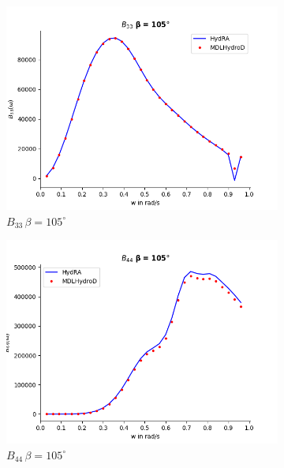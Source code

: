 \begin{figure}[H]
\begin{subfigure}[b]{0.45\textwidth}
    \end{subfigure}
    \vspace{5pt}%
    \begin{subfigure}[b]{0.45\textwidth}
        \includegraphics[width=\textwidth]{plots/kcs/rad_damp_deg_120/b33.png}
        \caption{$B_{33}\, \beta = 105^{\circ}$}
    \end{subfigure}
    \begin{subfigure}[b]{0.45\textwidth}
        \includegraphics[width=\textwidth]{plots/kcs/rad_damp_deg_120/b44.png}
        \caption{$B_{44} \, \beta = 105^{\circ}$}
    \end{subfigure}
    \vspace{5pt}%
    \begin{subfigure}[b]{0.45\textwidth}

\end{subfigure}
\end{figure}

